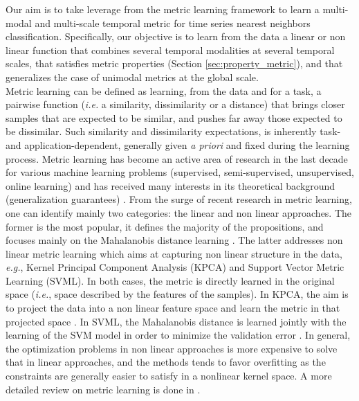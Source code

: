  Our aim is to take leverage from the metric learning framework \cite{Weinberger2009a,Bellet2012} to learn a multi-modal and multi-scale temporal metric for time series nearest neighbors classification. Specifically, our objective is to learn from the data a linear or non linear function that combines several temporal modalities at several temporal scales, that satisfies metric properties (Section \ref{sec:property_metric}), and that generalizes the case of unimodal metrics at the global scale. \\
Metric learning can be defined as learning, from the data and for a task, a pairwise function (\textit{i.e.} a similarity, dissimilarity or a distance) that brings closer samples that are expected to be similar, and pushes  far away those expected to be dissimilar. Such similarity and dissimilarity expectations, is inherently task- and application-dependent, generally given \textit{a priori} and fixed during the learning process. Metric learning has become an active area of research in the last decade for various machine learning problems (supervised, semi-supervised, unsupervised, online learning) and has received many interests in its theoretical background (generalization guarantees) \cite{Bellet2013a}. From the surge of recent research in metric learning, one can identify mainly two categories: the linear and non linear approaches. The former is the most popular, it defines the majority of the propositions, and focuses mainly on the Mahalanobis distance learning \cite{Weinberger2009}. The latter addresses non linear metric learning which aims at capturing non linear structure in the data, \textit{e.g.}, Kernel Principal Component Analysis (KPCA) and Support Vector Metric Learning (SVML). In both cases, the metric is directly learned in the original space (\textit{i.e.}, space described by the features of the samples). In KPCA, the aim is to project the data into a non linear feature space and learn the metric in that projected space \cite{Zhang2010,Chatpatanasiri2010}. In SVML, the Mahalanobis distance is learned jointly with the learning of the SVM model in order to minimize the validation error \cite{Xu2012}. In general, the optimization problems in non linear approaches is more expensive to solve that in linear approaches, and the methods tends to favor overfitting as the constraints are generally easier to satisfy in a nonlinear kernel space. A more detailed review on metric learning is done in \cite{Bellet2013a}.\\
